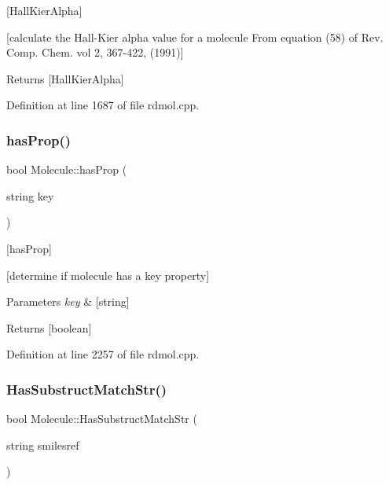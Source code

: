 \mbox{[}Hall\+Kier\+Alpha\mbox{]} 

\mbox{[}calculate the Hall-\/\+Kier alpha value for a molecule From equation (58) of Rev. Comp. Chem. vol 2, 367-\/422, (1991)\mbox{]}

\begin{DoxyReturn}{Returns}
\mbox{[}Hall\+Kier\+Alpha\mbox{]} 
\end{DoxyReturn}


Definition at line 1687 of file rdmol.\+cpp.

\mbox{\label{class_molecule_a7168f3faf1d150373c0b8728767d1d4b}} 
\subsubsection{\texorpdfstring{has\+Prop()}{hasProp()}}
{\footnotesize\ttfamily bool Molecule\+::has\+Prop (\begin{DoxyParamCaption}\item[{string}]{key }\end{DoxyParamCaption})}



\mbox{[}has\+Prop\mbox{]} 

\mbox{[}determine if molecule has a key property\mbox{]}


\begin{DoxyParams}{Parameters}
{\em key} & \mbox{[}string\mbox{]} \\
\hline
\end{DoxyParams}
\begin{DoxyReturn}{Returns}
\mbox{[}boolean\mbox{]} 
\end{DoxyReturn}


Definition at line 2257 of file rdmol.\+cpp.

\mbox{\label{class_molecule_a5494377b1f6db28c894941c0139496b3}} 
\subsubsection{\texorpdfstring{Has\+Substruct\+Match\+Str()}{HasSubstructMatchStr()}}
{\footnotesize\ttfamily bool Molecule\+::\+Has\+Substruct\+Match\+Str (\begin{DoxyParamCaption}\item[{string}]{smilesref }\end{DoxyParamCaption})}



